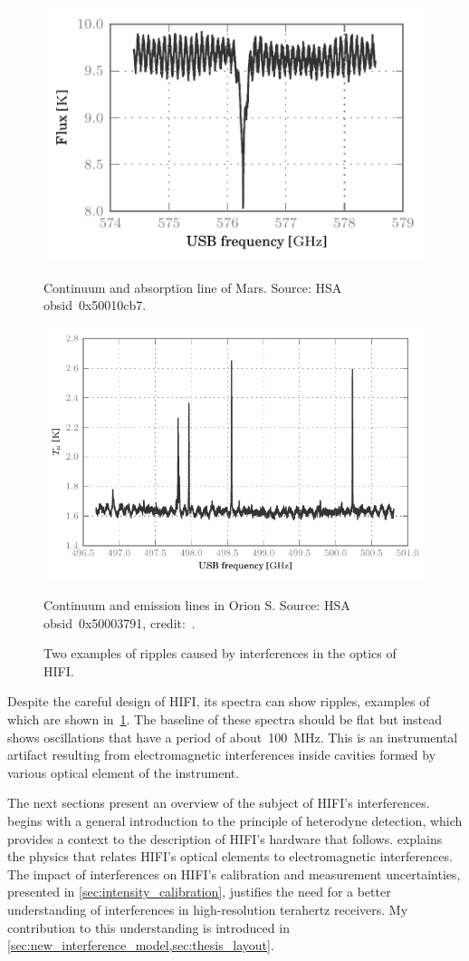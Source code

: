 \begin{figure}[bp]
    \centering
    \includegraphics[width=.8\textwidth]{mars_50010cb7_WBSH_USB}
    \caption*{Continuum and absorption line of Mars.
              Source: HSA obsid~0x50010cb7.
    }
    \bigskip
    \includegraphics[width=.8\textwidth]{50003791_00}
    \caption*{Continuum and emission lines in Orion S.
       Source: HSA obsid~0x50003791, credit:~\textcite{goldsmith2011herschel}.}
    \caption{Two examples of ripples caused by interferences in the optics of HIFI.}
    \label{fig:ripples}
\end{figure}


Despite the careful design of HIFI,
its spectra can show ripples, examples of which are shown in~\cref{fig:ripples}.
The baseline of these spectra should be flat but instead shows oscillations that have a period of about~\SI{100}{\mega\hertz}.
This is an instrumental artifact resulting from electromagnetic interferences inside cavities formed by various optical element of the instrument.

The next sections present an overview of the subject of HIFI's interferences.
 begins with a general introduction to the principle of heterodyne detection,
which provides a context to the description of HIFI's hardware that follows.
 explains the physics that relates HIFI's optical elements to electromagnetic interferences.
The impact of interferences on HIFI's calibration and measurement uncertainties, presented in \cref{sec:intensity_calibration},
justifies the need for a better understanding of interferences in high-resolution terahertz receivers.
My contribution to this understanding is introduced in
\cref{sec:new_interference_model,sec:thesis_layout}.




